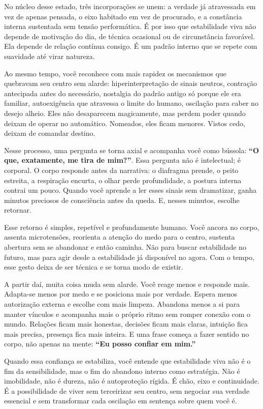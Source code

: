 \documentclass[12pt]{book}
\begin{document}
No núcleo desse estado, três incorporações se unem: a verdade já atravessada em vez de apenas pensada, o eixo habitado em vez de procurado, e a constância interna sustentada sem tensão performática. É por isso que estabilidade viva não depende de motivação do dia, de técnica ocasional ou de circunstância favorável. Ela depende de relação contínua consigo. É um padrão interno que se repete com suavidade até virar natureza.

Ao mesmo tempo, você reconhece com mais rapidez os mecanismos que quebravam seu centro sem alarde: hiperinterpretação de sinais neutros, contração antecipada antes do necessário, nostalgia do padrão antigo só porque ele era familiar, autoexigência que atravessa o limite do humano, oscilação para caber no desejo alheio. Eles não desaparecem magicamente, mas perdem poder quando deixam de operar no automático. Nomeados, eles ficam menores. Vistos cedo, deixam de comandar destino.

Nesse processo, uma pergunta se torna axial e acompanha você como bússola: \textbf{“O que, exatamente, me tira de mim?”}. Essa pergunta não é intelectual; é corporal. O corpo responde antes da narrativa: o diafragma prende, o peito estreita, a respiração encurta, o olhar perde profundidade, a postura interna contrai um pouco. Quando você aprende a ler esses sinais sem dramatizar, ganha minutos preciosos de consciência antes da queda. E, nesses minutos, escolhe retornar.

Esse retorno é simples, repetível e profundamente humano. Você ancora no corpo, assenta microtensões, reorienta a atenção do medo para o centro, sustenta abertura sem se abandonar e então caminha. Não para buscar estabilidade no futuro, mas para agir desde a estabilidade já disponível no agora. Com o tempo, esse gesto deixa de ser técnica e se torna modo de existir.

A partir daí, muita coisa muda sem alarde. Você reage menos e responde mais. Adapta-se menos por medo e se posiciona mais por verdade. Espera menos autorização externa e escolhe com mais limpeza. Abandona menos a si para manter vínculos e acompanha mais o próprio ritmo sem romper conexão com o mundo. Relações ficam mais honestas, decisões ficam mais claras, intuição fica mais precisa, presença fica mais inteira. E uma frase começa a fazer sentido no corpo, não apenas na mente: \textbf{“Eu posso confiar em mim.”}

Quando essa confiança se estabiliza, você entende que estabilidade viva não é o fim da sensibilidade, mas o fim do abandono interno como estratégia. Não é imobilidade, não é dureza, não é autoproteção rígida. É chão, eixo e continuidade. É a possibilidade de viver sem terceirizar seu centro, sem negociar sua verdade essencial e sem transformar cada oscilação em sentença sobre quem você é.
\end{document}
